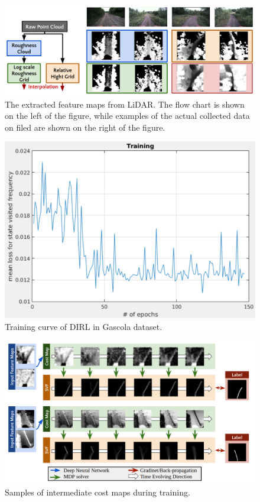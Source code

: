 \documentclass[../thesis.tex]{subfiles}
\begin{document}
\begin{figure}[t]
	\begin{center}
		\centerline{\includegraphics[width=\columnwidth]{./DIRL/fig/lidar_feature_map.png}}
		\caption{The extracted feature maps from LiDAR. The flow chart is shown on the left of the figure, while examples of the actual collected data on filed are shown on the right of the figure.}
		\label{fig:lidar_feature_map}
	\end{center}
\end{figure} 


\begin{figure}[t]
	\begin{center}
		\centerline{\includegraphics[width=0.5\columnwidth]{./DIRL/fig/dirl_training_curve.png}}
		\caption{Training curve of DIRL in Gascola dataset.}
		\label{fig:dirl_learning_curve}
	\end{center}
\end{figure} 

\begin{figure}[t]
	\begin{center}
		\centerline{\includegraphics[width=\columnwidth]{./DIRL/fig/inter_cost_map.png}}
		\caption{Samples of intermediate cost maps during training.}
		\label{fig:inter_cost_map}
	\end{center}
\end{figure} 
\end{document}
